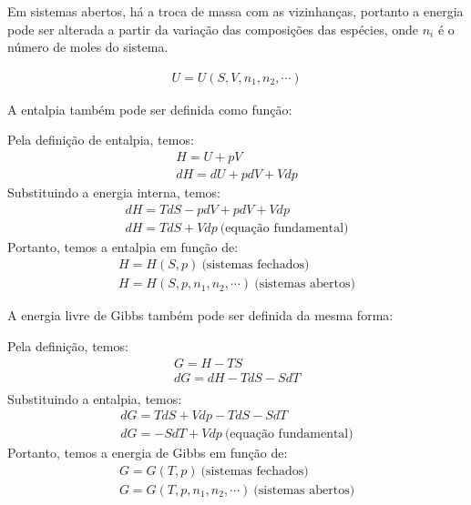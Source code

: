 \begin{multicols*}{2}
  Em sistemas abertos, há a troca de massa com as vizinhanças, portanto a energia pode ser alterada a partir da variação das composições das espécies, onde $n_i$ é o número de moles do sistema.
  \begin{theorem}
    \begin{gather}
      U = U(S,V,n_1,n_2, \cdots)    
    \end{gather}
  \end{theorem}

  A entalpia também pode ser definida como função:
  \begin{definition}
    Pela definição de entalpia, temos:
    \begin{gather}
      H = U + pV \\
      dH = dU + pdV + Vdp
    \end{gather}
    Substituindo a energia interna, temos:
    \begin{gather}
      dH = TdS - pdV + pdV + Vdp \\
      dH = TdS + Vdp \ \text{(equação fundamental)}
    \end{gather}
    Portanto, temos a entalpia em função de:
    \begin{gather}
      H = H(S,p) \ \text{(sistemas fechados)} \\
      H = H(S,p,n_1,n_2, \cdots) \ \text{(sistemas abertos)}
    \end{gather}
  \end{definition}

  A energia livre de Gibbs também pode ser definida da mesma forma:

  \begin{definition}
    Pela definição, temos:
    \begin{gather}
      G = H - TS \\
      dG = dH - TdS - SdT \\
    \end{gather}
    Substituindo a entalpia, temos:
    \begin{gather}
      dG = TdS + Vdp - TdS - SdT \\
      dG = -SdT + Vdp \ \text{(equação fundamental)}
    \end{gather}
    Portanto, temos a energia de Gibbs em função de:
    \begin{gather}
      G = G(T,p) \ \text{(sistemas fechados)} \\
      G = G(T,p,n_1,n_2,\cdots) \ \text{(sistemas abertos)}
    \end{gather}
  \end{definition}


\end{multicols*}
